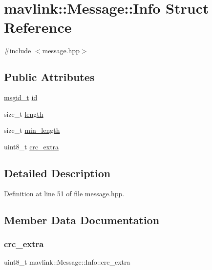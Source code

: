 \hypertarget{structmavlink_1_1Message_1_1Info}{}\section{mavlink\+::Message\+::Info Struct Reference}
\label{structmavlink_1_1Message_1_1Info}


{\ttfamily \#include $<$message.\+hpp$>$}

\subsection*{Public Attributes}
\begin{DoxyCompactItemize}
\item 
\mbox{\hyperlink{namespacemavlink_a98a1fe49b380ed1ea252d2c13bf3278d}{msgid\+\_\+t}} \mbox{\hyperlink{structmavlink_1_1Message_1_1Info_ae5984fd30d3e9ec4412386f88cfbe8be}{id}}
\item 
size\+\_\+t \mbox{\hyperlink{structmavlink_1_1Message_1_1Info_ab304bd0b3dbc5ddedb4e5d622c68f21e}{length}}
\item 
size\+\_\+t \mbox{\hyperlink{structmavlink_1_1Message_1_1Info_aecb3d686fd15622b3e5a57ce4126dd36}{min\+\_\+length}}
\item 
uint8\+\_\+t \mbox{\hyperlink{structmavlink_1_1Message_1_1Info_aa07bcd5fa25f60d1f86c6b71677371dd}{crc\+\_\+extra}}
\end{DoxyCompactItemize}


\subsection{Detailed Description}


Definition at line 51 of file message.\+hpp.



\subsection{Member Data Documentation}
\mbox{\label{structmavlink_1_1Message_1_1Info_aa07bcd5fa25f60d1f86c6b71677371dd}} 
\subsubsection{\texorpdfstring{crc\_extra}{crc\_extra}}
{\footnotesize\ttfamily uint8\+\_\+t mavlink\+::\+Message\+::\+Info\+::crc\+\_\+extra}



